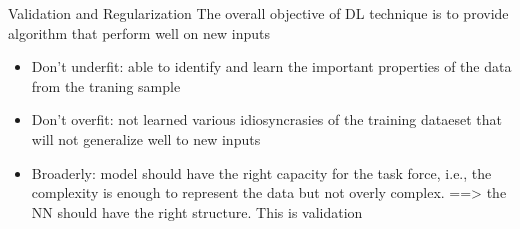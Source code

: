 \documentclass[aspectratio=169]{beamer} %
\begin{document}
\begin{frame}{Validation and Regularization}
The overall objective of DL technique is to provide algorithm that perform well on new inputs

\begin{itemize}
    \item Don't underfit: able to identify and learn the important properties of the data from the traning sample
    \item Don't overfit: not learned various idiosyncrasies of the training dataeset that will not generalize well to new inputs
    \item Broaderly: model should have the right capacity for the task force, i.e., the complexity is enough to represent the data but not overly complex. ==> the NN should have the right structure. This is validation
\end{itemize}
    
\end{frame}
\end{document}
